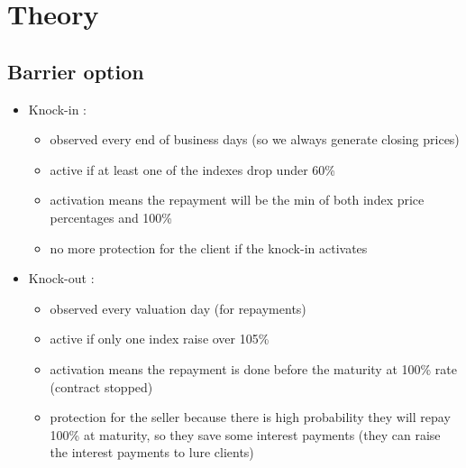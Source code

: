 \section{Theory}


\subsection{Barrier option}
\begin{frame}
\myframetitle{}
\begin{itemize}
	\item Knock-in :
	\begin{itemize}
		\item observed every end of business days (so we always generate closing prices)
		\item active if at least one of the indexes drop under 60\%
		\item activation means the repayment will be the min of both index price percentages and 100\%
		\item no more protection for the client if the knock-in activates
	\end{itemize}
	\item Knock-out :
	\begin{itemize}
		\item observed every valuation day (for repayments) 
		\item active if only one index raise over 105\%
		\item activation means the repayment is done before the maturity at 100\% rate (contract stopped)
		\item protection for the seller because there is high probability they will repay 100\% at maturity, so they save some interest payments (they can raise the interest payments to lure clients)
	\end{itemize}
\end{itemize}
\end{frame}

